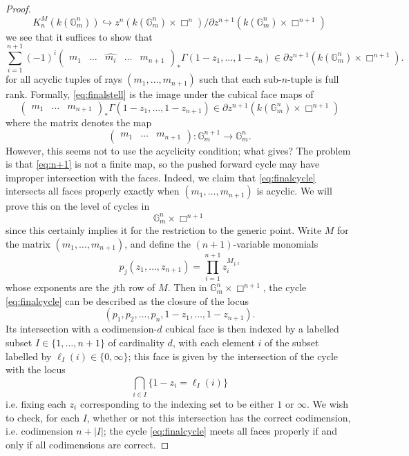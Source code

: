 \documentclass[10pt,a4paper]{amsart}
\begin{document}
\begin{proof}
        \[
        K_n^M(k(\mathbb{G}_m^n)) \hookrightarrow z^n(k(\mathbb{G}_m^n)\times \Box^n)/\partial z^{n+1}(k(\mathbb{G}_m^n)\times \Box^{n+1})
        \]
        we see that it suffices to show that 
        \begin{equation} \label{eq:finalstell}
        \sum_{i=1}^{n+1} (-1)^i \begin{pmatrix}m_1&\ldots& \hat{m_i} & \ldots   & m_{n+1}\end{pmatrix}_* \Gamma(1-z_1,\ldots, 1-z_n) \in \partial z^{n+1}(k(\mathbb{G}_m^n)\times \Box^{n+1}).
        \end{equation}
        for all acyclic tuples of rays $(m_1,\ldots, m_{n+1})$ such that each sub-$n$-tuple is full rank. Formally, \eqref{eq:finalstell} is the image under the cubical face maps of
        \begin{equation} \label{eq:finalcycle}
        \begin{pmatrix}m_1&\ldots & m_{n+1}\end{pmatrix}_* \Gamma(1-z_1,\ldots, 1-z_{n+1})\in \partial z^{n+1}(k(\mathbb{G}_m^n)\times \Box^{n+1})
        \end{equation}
        where the matrix denotes the map
        \begin{equation}\label{eq:n+1}
        \begin{pmatrix}m_1&\ldots & m_{n+1}\end{pmatrix}: \mathbb{G}_m^{n+1}\to \mathbb{G}_m^n.
        \end{equation}
        However, this seems not to use the acyclicity condition; what gives? The problem is that \eqref{eq:n+1} is not a finite map, so the pushed forward cycle may have improper intersection with the faces. Indeed, we claim that \eqref{eq:finalcycle} intersects all faces properly exactly when $(m_1,\ldots, m_{n+1})$ is acyclic. We will prove this on the level of cycles in 
        \[
        \mathbb{G}_m^n \times \Box^{n+1}
        \]
        since this certainly implies it for the restriction to the generic point. Write $M$ for the matrix $(m_1,\ldots, m_{n+1})$, and define the $(n+1)$-variable monomials
        \[
        p_j(z_1,\ldots, z_{n+1}) = \prod_{i=1}^{n+1} z_i^{M_{j,i}}
        \]
        whose exponents are the $j$th row of $M$. Then in $\mathbb{G}_m^n \times \Box^{n+1}$, the cycle \eqref{eq:finalcycle} can be described as the closure of the locus
        \[
        (p_1, p_2, \ldots, p_n, 1-z_1,\ldots, 1-z_{n+1}). 
        \]
        Its intersection with a codimension-$d$ cubical face is then indexed by a labelled subset $I\in \{1,\ldots, n+1\}$ of cardinality $d$, with each element $i$ of the subset labelled by $\ell_I(i)\in \{0,\infty\}$; this face is given by the intersection of the cycle with the locus
        \[
        \bigcap_{i\in I} \{ 1-z_i = \ell_I(i)\} 
        \]
        i.e. fixing each $z_i$ corresponding to the indexing set to be either $1$ or $\infty$. We wish to check, for each $I$, whether or not this intersection has the correct codimension, i.e. codimension $n+|I|$; the cycle \eqref{eq:finalcycle} meets all faces properly if and only if all codimensions are correct. 


\end{proof}
\end{document}
